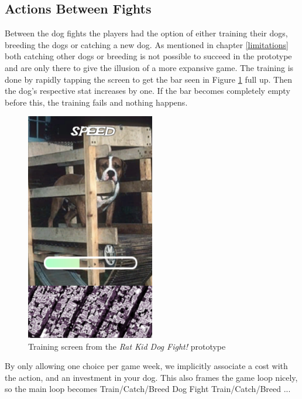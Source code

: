 \subsection{Actions Between Fights}
Between the dog fights the players had the option of either training their dogs, breeding the dogs or catching a new dog. As mentioned in chapter \ref{limitations} both catching other dogs or breeding is not possible to succeed in the prototype and are only there to give the illusion of a more expansive game. The training is done by rapidly tapping the screen to get the bar seen in Figure \ref{fig:training} full up. Then the dog's respective stat increases by one. If the bar becomes completely empty before this, the training fails and nothing happens.\ 

\begin{figure}[h!] 
	\centering
    \includegraphics[width=0.5\textwidth]{Training.png}
    \caption{Training screen from the \textit{Rat Kid Dog Fight!} prototype}
    \label{fig:training}
\end{figure}

By only allowing one choice per game week, we implicitly associate a cost with the action, and an investment in your dog. This also frames the game loop nicely, so the main loop becomes Train/Catch/Breed \rightarrow Dog Fight \rightarrow Train/Catch/Breed \rightarrow ...